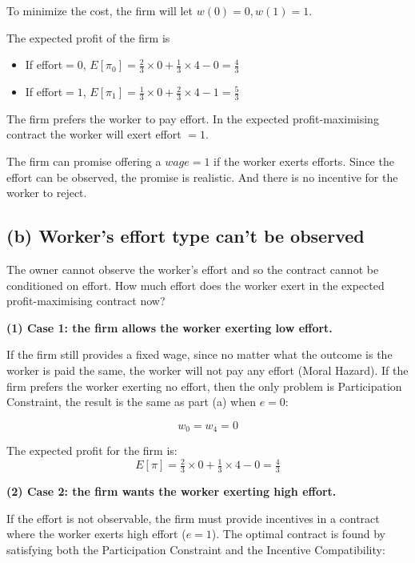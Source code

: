 \documentclass{article}
\begin{document}
To minimize the cost, the firm will let $w(0) = 0,  w(1) = 1$.

\medskip

The expected profit of the firm is 
\begin{itemize}
\item If effort$=0$, $E[\pi_0]= \tfrac23 \times 0 + \tfrac13 \times 4 - 0 =\tfrac43$
\item If effort$=1$, $E[\pi_1]= \tfrac13 \times 0 + \tfrac23 \times 4 - 1 =\tfrac53$
\end{itemize}

The firm prefers the worker to pay effort. In the expected
profit-maximising contract the worker will exert effort $=1$.

\begin{mdframed}[backgroundcolor=blue!20,linecolor=white]
The firm can promise offering a $wage = 1$ if the worker exerts efforts. Since the effort can be observed, the promise is realistic. And there is no incentive for the worker to reject.
\end{mdframed}

\subsection*{(b) Worker's effort type can't be observed}
The owner cannot observe the worker's effort and so the contract cannot be conditioned on
effort. How much effort does the worker exert in the expected profit-maximising contract now?

\bigskip

\textbf{(1) Case 1: the firm allows the worker exerting low effort.}

\medskip

If the firm still provides a fixed wage, since no matter what the outcome is the worker is paid the same, the worker will not pay any effort (Moral Hazard). If the firm prefers the worker exerting no effort, then the only problem is Participation Constraint, the result is the same as part (a) when $e=0$:

$$w_0 = w_4 = 0$$

The expected profit for the firm is: $$E[\pi]= \tfrac23 \times 0 + \tfrac13 \times 4 - 0 =\tfrac43$$

\medskip

\textbf{(2) Case 2: the firm wants the worker exerting high effort.}

\medskip

If the effort is not observable, the firm must provide incentives in a contract where the worker exerts high effort ($e=1$). The optimal contract is found by satisfying both the Participation Constraint and the Incentive Compatibility:
\end{document}
